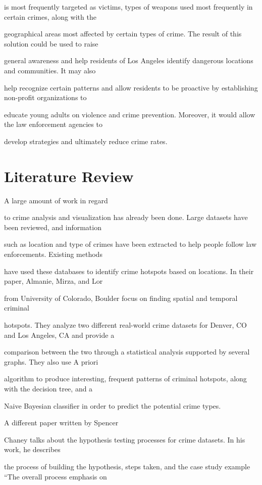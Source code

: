 \documentclass[sigconf]{acmart}
\begin{document}
is most frequently targeted as victims, types of weapons used most frequently in certain crimes, along with the 

geographical areas most affected by certain types of crime. The result of this solution could be used to raise 

general awareness and help residents of Los Angeles identify dangerous locations and communities. It may also 

help recognize certain patterns and allow residents to be proactive by establishing non-profit organizations to 

educate young adults on violence and crime prevention. Moreover, it would allow the law enforcement agencies to 

develop strategies and ultimately reduce crime rates.

\section{Literature Review}

A large amount of work in regard 

to crime analysis and visualization has already been done. Large datasets have been reviewed, and information 

such as location and type of crimes have been extracted to help people follow law enforcements. Existing methods 

have used these databases to identify crime hotspots based on locations. In their paper, Almanie, Mirza, and Lor 

from University of Colorado, Boulder \cite{crime-prediction} focus on finding spatial and temporal criminal 

hotspots. They analyze two different real-world crime datasets for Denver, CO and Los Angeles, CA and provide a 

comparison between the two through a statistical analysis supported by several graphs. They also use A priori 

algorithm to produce interesting, frequent patterns of criminal hotspots, along with the decision tree, and a 

Naive Bayesian classifier in order to predict the potential crime types.

A different paper written by Spencer 

Chaney \cite{www-ucl} talks about the hypothesis testing processes for crime datasets. In his work, he describes 

the process of building the hypothesis, steps taken, and the case study example ``The overall process emphasis on 
\end{document}
